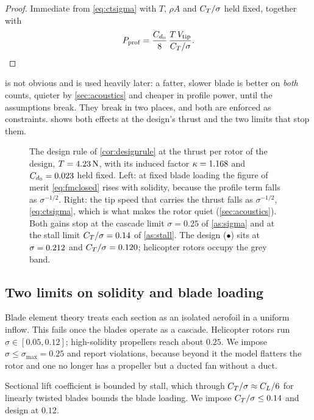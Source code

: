 \begin{proof}
Immediate from \cref{eq:ctsigma} with $T$, $\rho A$ and $C_T/\sigma$ held
fixed, together with
\[
  P_{\mathrm{prof}} = \frac{C_{d_0}}{8}\,\frac{T\,V_{\mathrm{tip}}}{C_T/\sigma} . \qedhere
\]
\end{proof}

 is not obvious and is used heavily later: a fatter,
slower blade is better on \emph{both} counts, quieter by
\cref{sec:acoustics} and cheaper in profile power, until the assumptions break.
They break in two places, and both are enforced as constraints.
 shows both effects at the design's thrust and the two
limits that stop them.

\begin{figure}[tbp]
\centering

\caption{The design rule of \cref{cor:designrule} at the thrust per rotor of
the design, $T = \SI{4.23}{\newton}$, with its induced factor
$\kappa = 1.168$ and $C_{d_0} = 0.023$ held fixed. Left: at fixed blade
loading the figure of merit \cref{eq:fmclosed} rises with solidity, because
the profile term falls as $\sigma^{-1/2}$. Right: the tip speed that carries
the thrust falls as $\sigma^{-1/2}$, \cref{eq:ctsigma}, which is what makes
the rotor quiet (\cref{sec:acoustics}). Both gains stop at the cascade limit
$\sigma = 0.25$ of \cref{as:sigma} and at the stall limit $C_T/\sigma = 0.14$
of \cref{as:stall}. The design ($\bullet$) sits at $\sigma = 0.212$ and
$C_T/\sigma = 0.120$; helicopter rotors occupy the grey band.}
\label{fig:designrule}
\end{figure}

\subsection{Two limits on solidity and blade loading}

\begin{assumption}
\label{as:sigma}
Blade element theory treats each section as an isolated aerofoil in a uniform
inflow. This fails once the blades operate as a cascade. Helicopter rotors run
$\sigma \in [0.05,0.12]$; high-solidity propellers reach about $0.25$. We
impose $\sigma \le \sigma_{\max} = 0.25$ and report violations, because beyond
it the model flatters the rotor and one no longer has a propeller but a ducted
fan without a duct.
\end{assumption}

\begin{assumption}
\label{as:stall}
Sectional lift coefficient is bounded by stall, which through
$C_T/\sigma \approx C_L/6$ for linearly twisted blades bounds the blade
loading. We impose $C_T/\sigma \le 0.14$ and design at $0.12$.
\end{assumption}

